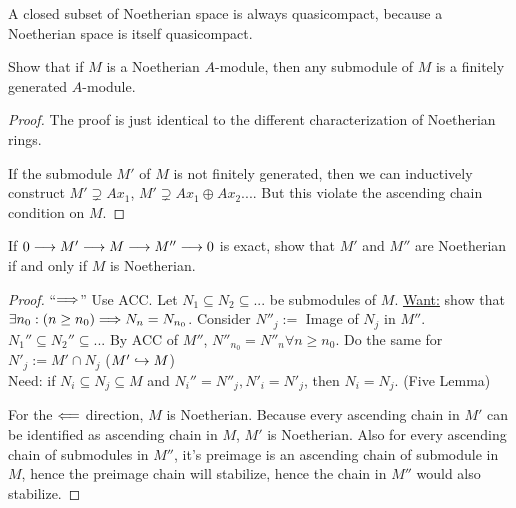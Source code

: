 \begin{remark}
A closed subset of Noetherian space is always quasicompact, because a Noetherian space is itself quasicompact.
\end{remark}

\begin{exr}\label{chap3exr:submodule_Notherian}
Show that if $ M$ is a Noetherian $A$-module, then any submodule of $M$ is a finitely generated $A$-module.
\end{exr}
\begin{proof}
The proof is just identical to the different characterization of Noetherian rings.

If the submodule $M'$ of $M$ is not finitely generated, then we can inductively construct $M'\supsetneq A x_1$, $M'\supsetneq A x_1\oplus Ax_2...$. But this violate the ascending chain condition on $M$.
\end{proof}

\begin{exr}\label{chap3exr:Noetherian_module_SES}
If $0\longrightarrow M' \longrightarrow M\longrightarrow M'' \longrightarrow 0$ is exact, show that $M'$ and $M''$ are Noetherian if and only if $M$ is Noetherian.
\end{exr}
\begin{proof}
``$\Longrightarrow$'' Use ACC. Let $N_1\subseteq N_2\subseteq ...$ be submodules of $M$. \underline{Want:}  show that $\exists n_0 :(n\geq n_0)\Longrightarrow N_n=N_{n_0}$.
Consider $N''_j:=$ Image of $N_j$ in $M''$. $ N_1''\subseteq N_2''\subseteq ...$ By ACC of $M''$, $N''_{n_0}=N''_{n}\forall n\geq n_0$. Do the same for $N'_j:=M'\cap N_j$ ($M'\hookrightarrow M$)\\
Need: if $N_i\subseteq N_j\subseteq M$ and $N_i''=N''_j, N'_i=N'_j$, then $N_i=N_j$. (Five Lemma)
\begin{center}
\end{center}

For the $\Longleftarrow$ direction, $M$ is Noetherian. Because every ascending chain in $M'$ can be identified as ascending chain in $M$, $M'$ is Noetherian. Also for every ascending chain of submodules in $M''$, it's preimage is an ascending chain of submodule in $M$, hence the preimage chain will stabilize, hence the chain in $M''$ would also stabilize.
\end{proof}

